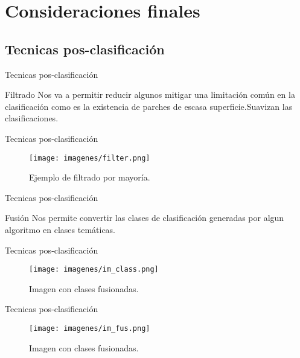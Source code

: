 \documentclass[handout]{beamer}
\begin{document}
\section{Consideraciones finales}

\subsection{Tecnicas pos-clasificación}

\begin{frame}{Tecnicas pos-clasificación}
  \begin{block}{Filtrado}
    Nos va a permitir reducir algunos mitigar una limitación común en la clasificaci\'on como es la existencia de parches de escasa superficie.\pause  Suavizan las clasificaciones.
  \end{block}
\end{frame}

\begin{frame}{Tecnicas pos-clasificación}
  \begin{figure}
    \texttt{[image: imagenes/filter.png]}
    \caption{Ejemplo de filtrado por mayor\'ia.}
  \end{figure}
\end{frame}

\begin{frame}{Tecnicas pos-clasificación}
  \begin{block}{Fusión}
    Nos permite convertir las clases de clasificación generadas por algun algoritmo en clases temáticas.
  \end{block}
\end{frame}

\begin{frame}{Tecnicas pos-clasificación}
  \begin{figure}
    \texttt{[image: imagenes/im\_class.png]}
    \caption{Imagen con clases fusionadas.}
  \end{figure}
\end{frame}

\begin{frame}{Tecnicas pos-clasificación}
  \begin{figure}
    \texttt{[image: imagenes/im\_fus.png]}
    \caption{Imagen con clases fusionadas.}
  \end{figure}
\end{frame}
\end{document}
